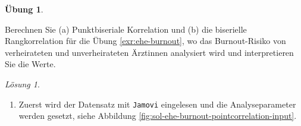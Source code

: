 \documentclass[
]{book}
\providecommand{\tightlist}{%
  \setlength{\itemsep}{0pt}\setlength{\parskip}{0pt}}
\theoremstyle{definition}
\theoremstyle{definition}
\theoremstyle{definition}
\newtheorem{exercise}{Übung}[chapter]
\theoremstyle{definition}
\theoremstyle{remark}
\newtheorem*{solution}{Lösung}
\begin{document}
\begin{exercise}
\protect\hypertarget{exr:ehe-burnout-correlation}{}\label{exr:ehe-burnout-correlation}\leavevmode

Berechnen Sie (a) Punktbiseriale Korrelation und (b) die biserielle Rangkorrelation für die Übung \ref{exr:ehe-burnout}, wo das Burnout-Risiko von verheirateten und unverheirateten Ärztinnen analysiert wird und interpretieren Sie die Werte.

\end{exercise}

\begin{solution}
\leavevmode

\begin{enumerate}
\def\labelenumi{\alph{enumi})}
\tightlist
\item
  Zuerst wird der Datensatz mit \texttt{Jamovi} eingelesen und die Analyseparameter werden gesetzt, siehe Abbildung \ref{fig:sol-ehe-burnout-pointcorrelation-input}.
\end{enumerate}

\begin{figure}


\end{figure}
\end{solution}
\end{document}
